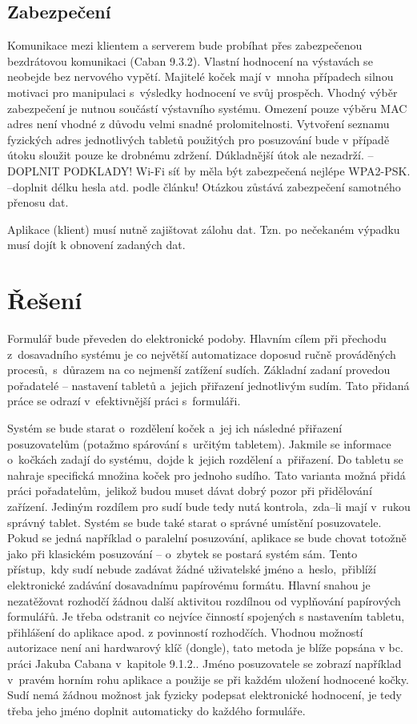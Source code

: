 \documentclass[11pt, oneside]{fithesis2}
\begin{document}
\section{Zabezpečení}

Komunikace mezi klientem a serverem bude probíhat přes zabezpečenou bezdrátovou komunikaci (Caban 9.3.2). Vlastní hodnocení na výstavách se neobejde bez nervového vypětí. Majitelé koček mají v~mnoha případech silnou motivaci pro 
manipulaci s~výsledky hodnocení ve svůj prospěch. Vhodný výběr zabezpečení je nutnou součástí výstavního systému. 
Omezení pouze výběru MAC adres není vhodné z důvodu velmi snadné prolomitelnosti. Vytvoření seznamu fyzických adres jednotlivých tabletů použitých pro posuzování bude v případě útoku sloužit pouze ke drobnému zdržení.
Dúkladnější útok ale nezadrží. --DOPLNIT PODKLADY! Wi-Fi síť by měla být zabezpečená nejlépe WPA2-PSK. --doplnit délku hesla atd. podle článku!
Otázkou zůstává zabezpečení samotného přenosu dat.

Aplikace (klient) musí nutně zajištovat zálohu dat.
Tzn. po nečekaném výpadku musí dojít k obnovení zadaných dat.
\linebreak

\chapter{Řešení}
Formulář bude převeden do elektronické podoby. Hlavním cílem při přechodu z~dosavadního systému je co největší automatizace doposud ručně prováděných procesů,~s~důrazem na co nejmenší zatížení sudích.
Základní zadaní provedou pořadatelé -- nastavení tabletů a~jejich přiřazení jednotlivým sudím. Tato přidaná práce se odrazí v~efektivnější práci s~formuláři.

Systém se bude starat o~rozdělení koček a~jej ich následné přiřazení posuzovatelům (potažmo spárování s~určitým tabletem). Jakmile se informace o~kočkách zadají do systému,~dojde k~jejich rozdělení a~přiřazení. Do tabletu se nahraje specifická množina koček pro jednoho sudího.
Tato varianta možná přidá práci pořadatelům,~jelikož budou muset dávat dobrý pozor při přidělování zařízení. Jediným rozdílem pro sudí bude tedy nutá kontrola,~zda--li mají v~rukou správný tablet.
Systém se bude také starat o správné umístění posuzovatele. Pokud se jedná například o paralelní posuzování, aplikace se bude chovat totožně jako při klasickém posuzování -- o~zbytek se postará systém sám.
Tento přístup,~kdy sudí nebude zadávat žádné uživatelské jméno a~heslo,~přiblíží elektronické zadávání dosavadnímu papírovému formátu.
Hlavní snahou je nezatěžovat rozhodčí žádnou další aktivitou rozdílnou od vyplňování papírových formulářů. Je třeba odstranit co nejvíce činností spojených s nastavením tabletu, přihlášení do aplikace apod. z povinností rozhodčích.
Vhodnou možností autorizace není ani hardwarový klíč (dongle), tato metoda je blíže popsána v bc. práci Jakuba Cabana v~kapitole 9.1.2..
Jméno posuzovatele se zobrazí například v~pravém horním rohu aplikace 
a použije se při každém uložení hodnocené kočky. Sudí nemá žádnou možnost jak fyzicky podepsat elektronické hodnocení, je tedy třeba jeho jméno doplnit automaticky do každého formuláře.
\linebreak
\end{document}
